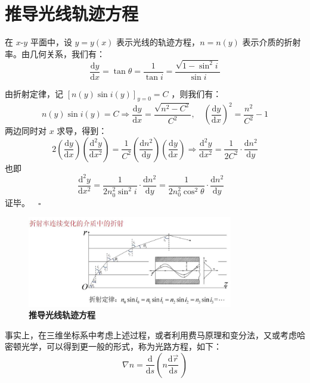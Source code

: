 \documentclass[UTF8]{report}
\theoremstyle{MyLineTheoremStyle} %
\theoremstyle{MyBlockTheoremStyle} %
\theoremstyle{MySubsubsectionStyle} %
\begin{document}
\section{推导光线轨迹方程}

在 $x$-$y$ 平面中，设 $y = y(x)$ 表示光线的轨迹方程，$n = n(y)$ 表示介质的折射率。由几何关系，我们有：
\begin{equation}
\frac{\mathrm{d} y }{\mathrm{d} x } = \tan \theta = \frac{1}{\tan i} = \frac{\sqrt{1-\sin^2 i}}{\sin i} 
\end{equation}

由折射定律，记 $[n(y)\sin i(y)]_{y=0} = C$ ，则我们有：
\begin{equation}
n(y)\sin i(y) = C \Longrightarrow \frac{\mathrm{d} y }{\mathrm{d} x } = \frac{\sqrt{n^2 - C^2}}{C^2}, \quad \left(\frac{\mathrm{d} y }{\mathrm{d} x }\right)^{2} = \frac{n^2}{C^2} - 1
\end{equation}
两边同时对 $x$ 求导，得到：
\begin{equation}
2 \left(\frac{\mathrm{d} y }{\mathrm{d} x }\right) \left(\frac{\mathrm{d}^2 y }{\mathrm{d} x^2 }\right) = \frac{1}{C^2} \left(\frac{\mathrm{d} n^2 }{\mathrm{d} y }\right) \left(\frac{\mathrm{d} y }{\mathrm{d} x }\right) \Longrightarrow \frac{\mathrm{d}^2 y }{\mathrm{d} x^2 } = \frac{1}{2C^2}\cdot \frac{\mathrm{d} n^2 }{\mathrm{d} y } 
\end{equation}
也即
\begin{equation}
    \frac{\mathrm{d}^2 y }{\mathrm{d} x^2 } = \frac{1}{2n_0^2\sin^2 i}\cdot \frac{\mathrm{d} n^2 }{\mathrm{d} y } = \frac{1}{2n_0^2\cos^2 \theta}\cdot \frac{\mathrm{d} n^2 }{\mathrm{d} y } \quad 
\end{equation}
证毕。$\quad \square$

\begin{figure}[H]\centering
\includegraphics[width=0.8\textwidth]{assets/88b3f41951f9d3be9e2964935ebaf0f7.jpg}
\caption{\textbf{推导光线轨迹方程}}\label{推导光线轨迹方程}
\end{figure}

事实上，在三维坐标系中考虑上述过程，或者利用费马原理和变分法，又或考虑哈密顿光学，可以得到更一般的形式，称为光路方程，如下：
\begin{equation}
    \nabla n=\frac{\mathrm{d}}{\mathrm{d}s}\left(n\frac{\mathrm{d}\vec{r}}{\mathrm{d}s}\,\right)
\end{equation}
\end{document}
